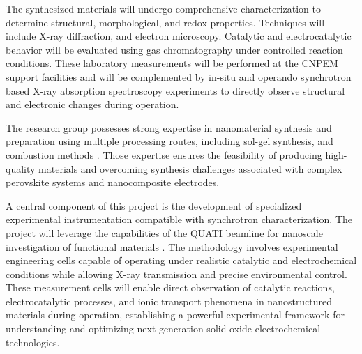 

The synthesized materials will undergo comprehensive characterization to determine structural, morphological, and redox properties. Techniques will include X-ray diffraction, and electron microscopy. Catalytic and electrocatalytic behavior will be evaluated using gas chromatography under controlled reaction conditions. These laboratory measurements will be performed at the CNPEM support facilities and will be complemented by in-situ and operando synchrotron based X-ray absorption spectroscopy experiments to directly observe structural and electronic changes during operation.

The research group possesses strong expertise in nanomaterial synthesis and preparation using multiple processing routes, including sol-gel synthesis, and combustion methods \cite{Diego2011,Lucia2016,Diego2024}. Those expertise ensures the feasibility of producing high-quality materials and overcoming synthesis challenges associated with complex perovskite systems and nanocomposite electrodes.

A central component of this project is the development of specialized experimental instrumentation compatible with synchrotron characterization. The project will leverage the capabilities of the QUATI beamline for nanoscale investigation of functional materials \cite{Santiago2023}. The methodology involves experimental engineering cells capable of operating under realistic catalytic and electrochemical conditions while allowing X-ray transmission and precise environmental control. These measurement cells will enable direct observation of catalytic reactions, electrocatalytic processes, and ionic transport phenomena in nanostructured materials during operation, establishing a powerful experimental framework for understanding and optimizing next-generation solid oxide electrochemical technologies.






